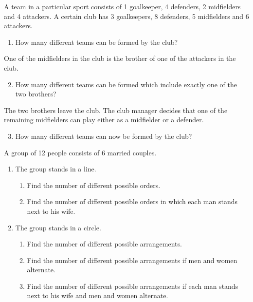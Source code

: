 \begin{problem}
    A team in a particular sport consists of 1 goalkeeper, 4 defenders, 2 midfielders and 4 attackers. A certain club has 3 goalkeepers, 8 defenders, 5 midfielders and 6 attackers.

    \begin{enumerate}
        \item How many different teams can be formed by the club?
    \end{enumerate}

    One of the midfielders in the club is the brother of one of the attackers in the club.

    \begin{enumerate}
        \setcounter{enumi}{1}
        \item How many different teams can be formed which include exactly one of the two brothers?
    \end{enumerate}

    The two brothers leave the club. The club manager decides that one of the remaining midfielders can play either as a midfielder or a defender.

    \begin{enumerate}
        \setcounter{enumi}{2}
        \item How many different teams can now be formed by the club?
    \end{enumerate}
\end{problem}

\begin{problem}
    A group of 12 people consists of 6 married couples.
    
    \begin{enumerate}
        \item The group stands in a line.
        \begin{enumerate}
            \item Find the number of different possible orders.
            \item Find the number of different possible orders in which each man stands next to his wife.
        \end{enumerate}
        \item The group stands in a circle.
        \begin{enumerate}
            \item Find the number of different possible arrangements.
            \item Find the number of different possible arrangements if men and women alternate.
            \item Find the number of different possible arrangements if each man stands next to his wife and men and women alternate.
        \end{enumerate}
    \end{enumerate}
\end{problem}

